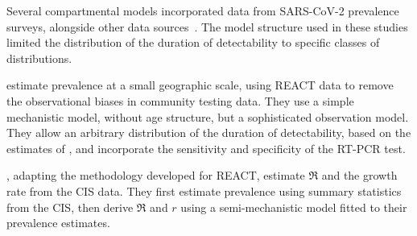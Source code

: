 \documentclass[thesis.tex]{subfiles}
\begin{document}
Several compartmental models incorporated data from SARS-CoV-2 prevalence surveys, alongside other data sources~\autocite{daviesAssociation,ironsEstimating,knockKey,nicholsonImproving,pooleyEstimation,birrellRTM2}.
The model structure used in these studies limited the distribution of the duration of detectability to specific classes of distributions.

\Textcite{nicholsonImproving} estimate prevalence at a small geographic scale, using REACT data to remove the observational biases in community testing data.
They use a simple mechanistic model, without age structure, but a sophisticated observation model.
They allow an arbitrary distribution of the duration of detectability, based on the estimates of \textcite{hellewellPCRSensitivity}, and incorporate the sensitivity and specificity of the RT-PCR test.

\Textcite{mccabeCISincidence}, adapting the methodology \textcite{ealesAppropriately} developed for REACT, estimate $\Re$ and the growth rate from the CIS data.
They first estimate prevalence using summary statistics from the CIS, then derive $\Re$ and $r$ using a semi-mechanistic model fitted to their prevalence estimates.

\end{document}
